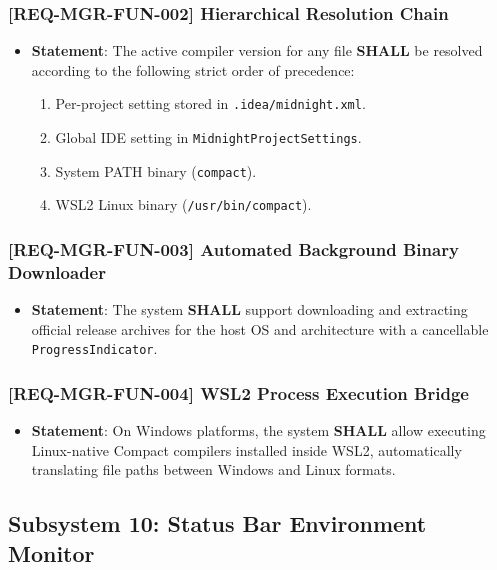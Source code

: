 \subsubsection{[REQ-MGR-FUN-002] Hierarchical Resolution Chain}
\begin{itemize}
    \item \textbf{Statement}: The active compiler version for any file \textbf{SHALL} be resolved according to the following strict order of precedence:
    \begin{enumerate}
        \item Per-project setting stored in \texttt{.idea/midnight.xml}.
        \item Global IDE setting in \texttt{MidnightProjectSettings}.
        \item System PATH binary (\texttt{compact}).
        \item WSL2 Linux binary (\texttt{/usr/bin/compact}).
    \end{enumerate}
\end{itemize}

\subsubsection{[REQ-MGR-FUN-003] Automated Background Binary Downloader}
\begin{itemize}
    \item \textbf{Statement}: The system \textbf{SHALL} support downloading and extracting official release archives for the host OS and architecture with a cancellable \texttt{ProgressIndicator}.
\end{itemize}

\subsubsection{[REQ-MGR-FUN-004] WSL2 Process Execution Bridge}
\begin{itemize}
    \item \textbf{Statement}: On Windows platforms, the system \textbf{SHALL} allow executing Linux-native Compact compilers installed inside WSL2, automatically translating file paths between Windows and Linux formats.
\end{itemize}

\subsection{Subsystem 10: Status Bar Environment Monitor}
\label{sec:subsystem_statusbar}

